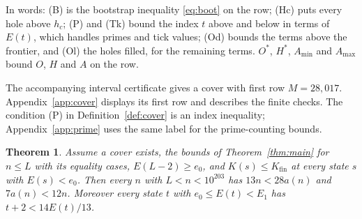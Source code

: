 \documentclass[11pt]{article}
\newtheorem{theorem}{Theorem}
\theoremstyle{definition}
\theoremstyle{remark}
\begin{document}
In words: (B) is the bootstrap inequality \eqref{eq:boot} on the row;
(Hc) puts every hole above $h_c$; (P) and (Tk) bound the index $t$ above
and below in terms of $E(t)$, which handles primes and tick values; (Od)
bounds the terms above the frontier, and (Ol) the holes filled, for the
remaining terms. $O^*$, $H^*$, $A_{\min}$ and $A_{\max}$ bound $O$, $H$ and
$A$ on the row.

The accompanying interval certificate gives a cover with first row
$M=28{,}017$. Appendix~\ref{app:cover} displays its first row and describes
the finite checks. The condition (P) in Definition~\ref{def:cover} is an
index inequality; Appendix~\ref{app:prime} uses the same label for the
prime-counting bounds.

\begin{theorem}\label{thm:T}
Assume a cover exists, the bounds of Theorem~\ref{thm:main} for $n\le L$
with its equality cases, $E(L-2)\ge e_0$, and $K(s)\le K_{\mathrm{fin}}$ at
every state $s$ with $E(s)<e_0$. Then every $n$ with $L<n<10^{203}$ has
$13n<28a(n)$ and $7a(n)<12n$. Moreover every state $t$ with
$e_0\le E(t)<E_1$ has $t+2<14E(t)/13$.
\end{theorem}
\end{document}

